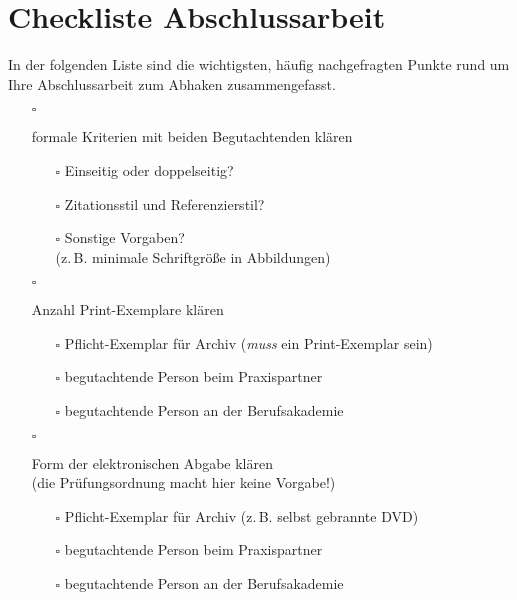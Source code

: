 \pagestyle{empty}
\cleardoublepage
{}
\chapter*{Checkliste Abschlussarbeit}
In der folgenden Liste sind die wichtigsten, häufig nachgefragten Punkte rund um Ihre Abschlussarbeit zum Abhaken zusammengefasst.


\begin{itemize}
    \item[$\square$]{
        formale Kriterien mit beiden Begutachtenden klären
        \begin{itemize}
            \item[$\square$] Einseitig oder doppelseitig?
            \item[$\square$] Zitationsstil und Referenzierstil?
            \item[$\square$]{
                Sonstige Vorgaben?\\
                (z.\,B. minimale Schriftgröße in Abbildungen)
            }
        \end{itemize}
    }
    \item[$\square$]{
        Anzahl Print-Exemplare klären
        \begin{itemize}
            \item[$\square$] Pflicht-Exemplar für Archiv (\emph{muss} ein Print-Exemplar sein)
            \item[$\square$] begutachtende Person beim Praxispartner
            \item[$\square$] begutachtende Person an der Berufsakademie
        \end{itemize}
    }
    \item[$\square$]{
        Form der elektronischen Abgabe klären\\
        (die Prüfungsordnung macht hier keine Vorgabe!)
        \begin{itemize}
            \item[$\square$] Pflicht-Exemplar für Archiv (z.\,B. selbst gebrannte DVD)
            \item[$\square$] begutachtende Person beim Praxispartner
            \item[$\square$] begutachtende Person an der Berufsakademie

\end{itemize}}
\end{itemize}
